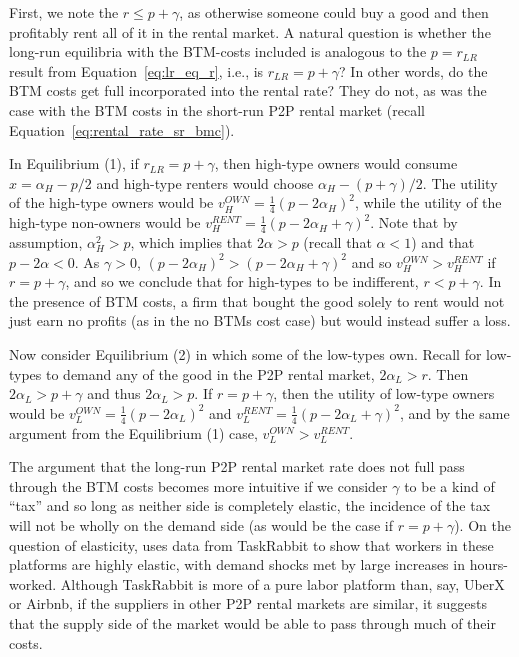 \documentclass[11pt]{article}
\begin{document}
First, we note the $r \le p + \gamma$, as otherwise someone could buy a good and then profitably rent all of it in the rental market.
A natural question is whether the long-run equilibria with the BTM-costs included is analogous to the $p = r_{LR}$ result from Equation~\ref{eq:lr_eq_r}, i.e., is $r_{LR} = p + \gamma$? 
In other words, do the BTM costs get full incorporated into the rental rate?
They do not, as was the case with the BTM costs in the short-run P2P rental market (recall Equation~\ref{eq:rental_rate_sr_bmc}). 

In Equilibrium (1), if $r_{LR} = p + \gamma$,  then high-type owners would consume $x = \alpha_H - p/2$ and high-type renters would choose $\alpha_H - (p + \gamma)/2$.
The utility of the high-type owners would be $v_H^{OWN} = \frac{1}{4}(p - 2\alpha_H)^2$, while the utility of the high-type non-owners would be $v_H^{RENT} = \frac{1}{4} \left(p - 2\alpha_H + \gamma \right)^2$.
Note that by assumption, $\alpha_H^2 > p$, which implies that $2 \alpha > p$ (recall that $\alpha < 1$) and that $p - 2\alpha < 0$.
As $\gamma > 0$, $(p - 2\alpha_H)^2 > (p - 2\alpha_H + \gamma)^2$ and so $v_H^{OWN} > v_H^{RENT}$ if $r = p + \gamma$, and so we conclude that for high-types to be indifferent, $r < p + \gamma$.
In the presence of BTM costs, a firm that bought the good solely to rent would not just earn no profits (as in the no BTMs cost case) but would instead suffer a loss. 

Now consider Equilibrium (2) in which some of the low-types own.
Recall for low-types to demand any of the good in the P2P rental market, $2\alpha_L > r$. 
Then $2\alpha_L > p + \gamma$ and thus $2\alpha_L > p$.
If $r = p + \gamma$, then the utility of low-type owners would be $v_L^{OWN} = \frac{1}{4}(p - 2\alpha_L)^2$ and $v_L^{RENT} = \frac{1}{4}(p - 2\alpha_L + \gamma)^2$, and by the same argument from the Equilibrium (1) case, $v_L^{OWN} > v_L^{RENT}$. 

The argument that the long-run P2P rental market rate does not full pass through the BTM costs becomes more intuitive if we consider $\gamma$ to be a kind of ``tax'' and so long as neither side is completely elastic, the incidence of the tax will not be wholly on the demand side (as would be the case if $r = p + \gamma$). 
On the question of elasticity, \cite{cullen2014outsourcing} uses data from TaskRabbit to show that workers in these platforms are highly elastic, with demand shocks met by large increases in hours-worked.
Although TaskRabbit is more of a pure labor platform than, say, UberX or Airbnb, if the suppliers in other P2P rental markets are similar, it suggests that the supply side of the market would be able to pass through much of their costs. 
\end{document}
